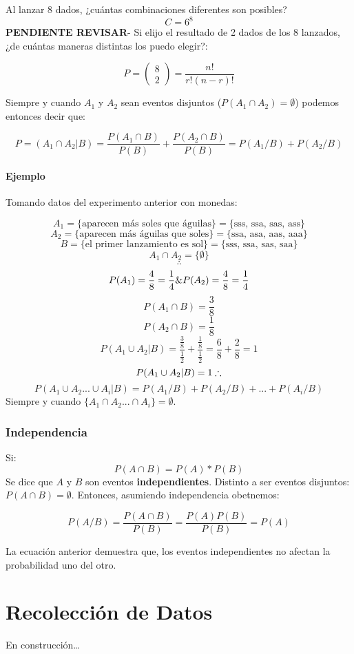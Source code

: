 \documentclass[]{book}
\begin{document}
Al lanzar 8 dados, ¿cuántas combinaciones diferentes son posibles?
\[C = 6^8\] \textbf{PENDIENTE REVISAR}- Si elijo el resultado de 2 dados
de los 8 lanzados, ¿de cuántas maneras distintas los puedo elegir?:

\[P = \left( \begin{array}{c} 8 \\ 2 \end{array} \right) = \frac {n!}{r!(n-r)!}\]

Siempre y cuando \(A_1\) y \(A_2\) sean eventos disjuntos
(\(P(A_1\cap A_2) = \emptyset\)) podemos entonces decir que:

\[P = (A_1 \cap A_2 \vert B) = \frac {P(A_1 \cap B)}{P(B)}+ \frac {P(A_2 \cap B)}{P(B)} = P(A_1/B) + P(A_2/B)\]

\subsubsection{Ejemplo}\label{ejemplo-1}

Tomando datos del experimento anterior con monedas:

\[A_1 = \{\text{aparecen más soles que águilas}\} = \{\text{sss, ssa, sas, ass}\}\]
\[A_2 = \{\text{aparecen más águilas que soles}\} = \{\text{ssa, asa, aas, aaa}\}\]
\[B = \{\text{el primer lanzamiento es sol}\} = \{\text{sss, ssa, sas, saa}\}\]
\[A_1 \cap A_2 = \{\emptyset\}\] \[\therefore\]
\[P(A_1) = \frac {4}{8} = \frac {1}{4}\space \& \space P(A_2) = \frac {4}{8} = \frac {1}{4}\]
\[P(A_1\cap B) = \frac{3}{8}\] \[P(A_2\cap B) = \frac{1}{8}\]
\[P(A_1\cup A_2\vert B) = \frac {\frac{3}{8}}{\frac{1}{2}} + \frac{\frac{1}{8}}{\frac{1}{2}} = \frac{6}{8} + \frac{2}{8} = 1\]
\[P(A_1\cup A_2\vert B) = 1 \space \therefore\]
\[P(A_1\cup A_2...\cup A_i \vert B) = P(A_1/B) + P(A_2/B)+...+ P(A_i/B)\]
Siempre y cuando \(\{A_1\cap A_2...\cap A_i\}= \emptyset\).

\subsection{Independencia}\label{independencia}

Si: \[P(A\cap B) = P(A)*P(B)\] Se dice que \(A\) y \(B\) son eventos
\textbf{independientes}. Distinto a ser eventos disjuntos:
\(P(A\cap B) = \emptyset\). Entonces, asumiendo independencia obetnemos:

\[P(A/B) = \frac {P(A\cap B)}{P(B)} = \frac{P(A)P(B)}{P(B)} = P(A)\]

La ecuación anterior demuestra que, los eventos independientes no
afectan la probabilidad uno del otro.

\chapter{Recolección de Datos}\label{recoleccion-de-datos}

En construcción\ldots{}


\end{document}
